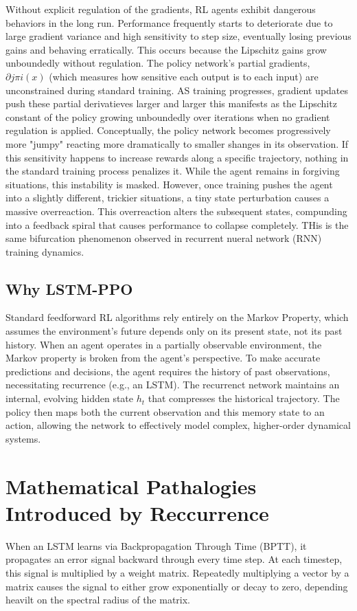 \documentclass[11pt,a4paper]{article}
\begin{document}
Without explicit regulation of the gradients, RL agents exhibit dangerous behaviors in the long run. Performance frequently starts to deteriorate due to large gradient variance and high sensitivity to step size, eventually losing previous gains and behaving erratically. This occurs because the Lipschitz gains grow unboundedly without regulation. 
The policy network's partial gradients, $\partial j \pi i(x)$ (which measures how sensitive each output is to each input) are unconstrained during standard training. AS training progresses, gradient updates push these partial derivatieves larger and larger this manifests as the Lipschitz constant of the policy growing unboundedly over iterations when no gradient regulation is applied. 
Conceptually, the policy network becomes progressively more "jumpy" reacting more dramatically to smaller shanges in its observation. If this sensitivity happens to increase rewards along a specific trajectory, nothing in the standard training process penalizes it. While the agent remains in forgiving situations, this instability is masked. However, once training pushes the agent into a slightly different, trickier situations, a tiny state perturbation causes a massive overreaction. This overreaction alters the subsequent states, compunding into a feedback spiral that causes performance to collapse completely. THis is the same bifurcation phenomenon observed in recurrent nueral network (RNN) training dynamics. 

\subsection{Why LSTM-PPO}
Standard feedforward RL algorithms rely entirely on the Markov Property, which assumes the environment's future depends only on its present state, not its past history. When an agent operates in a partially observable environment, the Markov property is broken from the agent's perspective. To make accurate predictions and decisions, the agent requires the history of past observations, necessitating recurrence (e.g., an LSTM). 
The recurrenct network maintains an internal, evolving hidden state $h_t$ that compresses the historical trajectory. The policy then maps both the current observation and this memory state to an action, allowing the network to effectively model complex, higher-order dynamical systems. 



\section{Mathematical Pathalogies Introduced by Reccurrence}
When an LSTM learns via Backpropagation Through Time (BPTT), it propagates an error signal backward through every time step. At each timestep, this signal is multiplied by a weight matrix. Repeatedly multiplying a vector by a matrix causes the signal to either grow exponentially or decay to zero, depending heavilt on the spectral radius of the matrix. 
\end{document}
